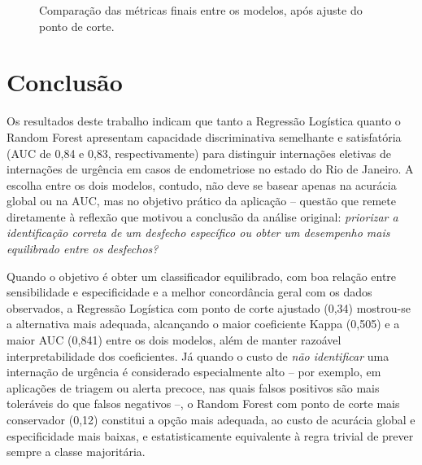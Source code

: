 \documentclass[12pt,a4paper]{article}
\begin{document}
\begin{figure}[H]
\centering
{}
\caption{Comparação das métricas finais entre os modelos, após ajuste do ponto de corte.}
\label{fig:comparacao_grafico}
\end{figure}

\section{Conclusão}

Os resultados deste trabalho indicam que tanto a Regressão Logística quanto o Random Forest apresentam capacidade discriminativa semelhante e satisfatória (AUC de 0,84 e 0,83, respectivamente) para distinguir internações eletivas de internações de urgência em casos de endometriose no estado do Rio de Janeiro. A escolha entre os dois modelos, contudo, não deve se basear apenas na acurácia global ou na AUC, mas no objetivo prático da aplicação -- questão que remete diretamente à reflexão que motivou a conclusão da análise original: \emph{priorizar a identificação correta de um desfecho específico ou obter um desempenho mais equilibrado entre os desfechos?}

Quando o objetivo é obter um classificador equilibrado, com boa relação entre sensibilidade e especificidade e a melhor concordância geral com os dados observados, a Regressão Logística com ponto de corte ajustado (0,34) mostrou-se a alternativa mais adequada, alcançando o maior coeficiente Kappa (0,505) e a maior AUC (0,841) entre os dois modelos, além de manter razoável interpretabilidade dos coeficientes. Já quando o custo de \emph{não identificar} uma internação de urgência é considerado especialmente alto -- por exemplo, em aplicações de triagem ou alerta precoce, nas quais falsos positivos são mais toleráveis do que falsos negativos --, o Random Forest com ponto de corte mais conservador (0,12) constitui a opção mais adequada, ao custo de acurácia global e especificidade mais baixas, e estatisticamente equivalente à regra trivial de prever sempre a classe majoritária.
\end{document}
